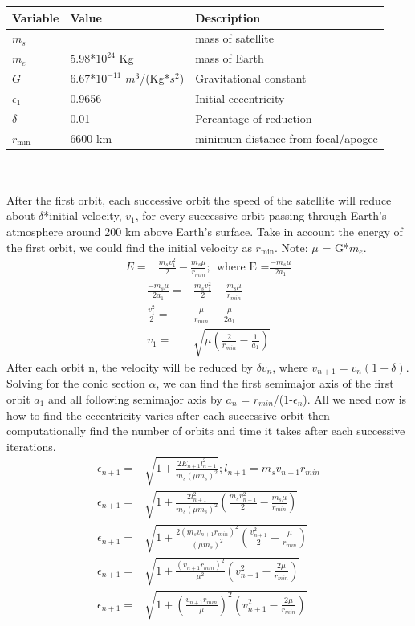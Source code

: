 \documentclass[11pt]{article}
\begin{document}
\begin{tabular}{l|l|l}
    Variable & Value &  Description \\ 
    \hline 
     $m_s$ &  & mass of satellite \\
     $m_e$ & 5.98*$10^{24} $ Kg & mass of Earth \\
     $G$ & 6.67*$10^{-11}$ $m^3$/(Kg*$s^2$) & Gravitational constant \\
     $\epsilon_1$ & 0.9656 & Initial eccentricity \\
     $\delta$ & 0.01 & Percantage of reduction \\
     $r_{\text{min}}$ & 6600 km & minimum distance from focal/apogee 
\end{tabular} 
\\
\\
After the first orbit, each successive orbit the speed of the satellite will reduce about $\delta$*initial velocity, $v_1$, for every successive orbit passing through Earth's atmosphere around 200 km above Earth's surface. Take in account the energy of the first orbit, we could find the initial velocity as $r_{\text{min}}$. Note: $\mu$ = G*$m_e$.
\begin{align*}
    E = & \frac{m_sv_1^2}{2} - \frac{m_s\mu}{r_{min}} ; \ \ \text{where E =} \frac{-m_s\mu}{2a_1} 
    \end{align*}
    \begin{align*}
         \frac{-m_s\mu}{2a_1} = &  \frac{m_sv_1^2}{2} - \frac{m_s\mu}{r_{min}} \\
           \frac{v_1^2}{2} = & \frac{\mu}{r_{min}}  - \frac{\mu}{2a_1} \\
   v_1 =& \sqrt{\mu(\frac{2}{r_{min}}  - \frac{1}{a_1})}
\end{align*}
After each orbit n, the velocity will be reduced by $\delta v_n$, where $v_{n+1} = v_n(1-\delta)$. Solving for the conic section $\alpha$, we can find the first semimajor axis of the first orbit $a_1$ and all following semimajor axis by $a_{n}$ = $r_{min}$/(1-$\epsilon_n$). 
All we need now is how to find the eccentricity varies after each successive orbit then computationally find the number of orbits and time it takes after each successive iterations. 
\begin{align*}
    \epsilon_{n+1} = &  \sqrt{1+\frac{2E_{n+1}l_{n+1}^2}{m_s(\mu m_s)^2}}; l_{n+1} = m_sv_{n+1}r_{min} \\
    \epsilon_{n+1} = &  \sqrt{1+\frac{2l_{n+1}^2}{m_s(\mu m_s)^2}(\frac{m_sv_{n+1}^2}{2} - \frac{m_s\mu}{r_{min}})} \\
    \epsilon_{n+1} = &  \sqrt{1+\frac{2( m_sv_{n+1}r_{min})^2}{(\mu m_s)^2}(\frac{v_{n+1}^2}{2} - \frac{\mu}{r_{min}})} \\
    \epsilon_{n+1} = &  \sqrt{1+\frac{(v_{n+1}r_{min})^2}{\mu^2}(v_{n+1}^2 - \frac{2\mu}{r_{min}})} \\
    \epsilon_{n+1} = &  \sqrt{1+(\frac{v_{n+1}r_{min}}{\mu})^2(v_{n+1}^2 - \frac{2\mu}{r_{min}})} 
\end{align*}
\end{document}
